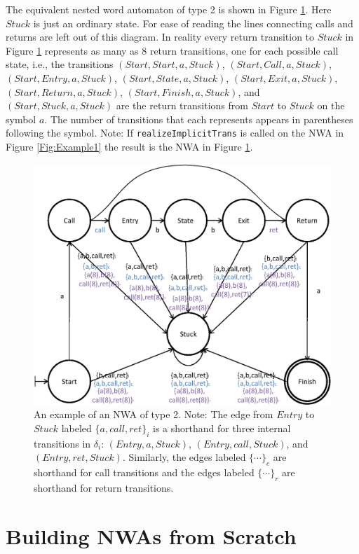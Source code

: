 \documentclass{llncs}
\begin{document}
The equivalent nested word automaton of type 2 is shown in Figure \ref{Fig:Example2}.  Here $Stuck$ is just an ordinary state.  For ease of reading the lines connecting calls and returns are left out of this diagram.  In reality every return transition to $Stuck$ in Figure \ref{Fig:Example2} represents as many as 8 return transitions, one for each possible call state, i.e., the transitions $(Start,Start,a,Stuck)$, $(Start,Call,a,Stuck)$, $(Start,Entry,a,Stuck)$, $(Start,State,a,Stuck)$, $(Start,Exit,a,Stuck)$, $(Start,Return,a,Stuck)$, $(Start,Finish,a,Stuck)$, and $(Start,Stuck,a,Stuck)$ are the return transitions from $Start$ to $Stuck$ on the symbol $a$.  The number of transitions that each represents appears in parentheses following the symbol.  Note: If \texttt{realizeImplicitTrans} is called on the NWA in Figure \ref{Fig:Example1} the result is the NWA in Figure \ref{Fig:Example2}.

\begin{figure}[htb]
  \centering
    \includegraphics[width=12cm]{Figures/Figure2.eps}
  \caption{An example of an NWA of type 2.  Note: The edge from $Entry$ to $Stuck$ labeled $\{a,call,ret\}_i$ is a shorthand for three internal transitions in $\delta_i$: $(Entry,a,Stuck)$, $(Entry,call,Stuck)$, and $(Entry,ret,Stuck)$.  Similarly, the edges labeled $\{\cdots\}_c$ are shorthand for call transitions and the edges labeled $\{\cdots\}_r$ are shorthand for return transitions.}  
  \label{Fig:Example2}
\end{figure}


\section{Building NWAs from Scratch}
\label{Se:Scratch}
\end{document}
